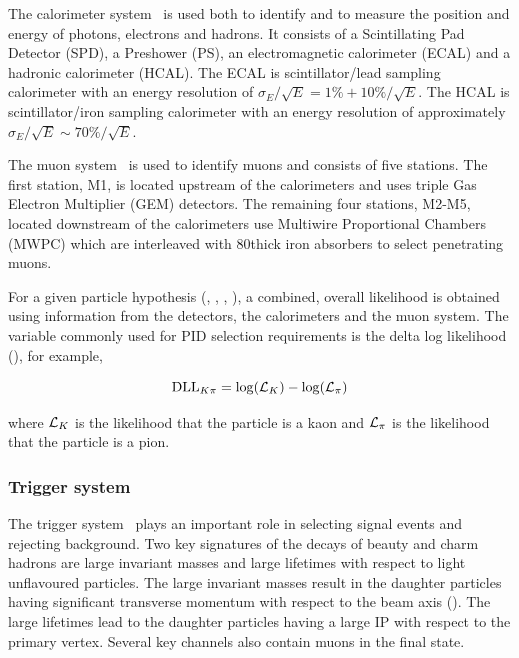 The calorimeter system~\cite{LHCb-TDR-002} is used both to identify and to measure the position and energy of photons, electrons and hadrons. It consists of a Scintillating Pad Detector (SPD), a Preshower (PS), an electromagnetic calorimeter (ECAL) and a hadronic calorimeter (HCAL). The ECAL is scintillator/lead sampling calorimeter with an energy resolution of $\sigma_{E}/\sqrt{E} = 1\% + 10\%/\sqrt{E}$. The HCAL is scintillator/iron sampling calorimeter with an energy resolution of approximately $\sigma_{E}/\sqrt{E} \sim 70\%/\sqrt{E}$. 

The muon system~\cite{LHCb-TDR-004,muon-tdr2,muon-tdr3,LHCb-DP-2012-002} is used to identify muons and consists of five stations. The first station, M1, is located upstream of the calorimeters and uses triple Gas Electron Multiplier (GEM) detectors. The remaining four stations, M2-M5, located downstream of the calorimeters use Multiwire Proportional Chambers (MWPC) which are interleaved with 80\cm thick iron absorbers to select penetrating muons.

For a given particle hypothesis (\kaon, \pion, \muon, \proton), a combined, overall likelihood is obtained using information from the \rich detectors, the calorimeters and the muon system. The variable commonly used for PID selection requirements is the delta log likelihood (\dll), for example,

\begin{equation}
\mathrm{DLL}_{{K}{\pi}} = \log(\mathcal{L}_{{K}}) - \log(\mathcal{L}_{{\pi}})
\end{equation}

\noindent where $\mathcal{L}_{{K}}$ is the likelihood that the particle is a kaon and $\mathcal{L}_{{\pi}}$ is the likelihood that the particle is a pion.
\subsubsection{Trigger system}
\label{detector:trigger}

The \lhcb trigger system~\cite{LHCb-TDR-010,LHCb-DP-2012-004} plays an important role in selecting signal events and rejecting background. Two key signatures of the decays of beauty and charm hadrons are large invariant masses and large lifetimes with respect to light unflavoured particles. The large invariant masses result in the daughter particles having significant transverse momentum with respect to the beam axis (\pt). The large lifetimes lead to the daughter particles having a large IP with respect to the primary vertex. Several key channels also contain muons in the final state.

